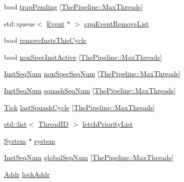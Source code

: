\begin{DoxyCompactItemize}
\item 
bool \hyperlink{classInOrderCPU_ab7c4ed509aab4ab66a4d1c212dab659c}{trapPending} \mbox{[}\hyperlink{namespaceThePipeline_ac9c0bbe9cf27d93e08ea8ccc4096e633}{ThePipeline::MaxThreads}\mbox{]}
\item 
std::queue$<$ \hyperlink{classEvent}{Event} $\ast$ $>$ \hyperlink{classInOrderCPU_a27f6e838bf5d421831ac5e451e61ccce}{cpuEventRemoveList}
\item 
bool \hyperlink{classInOrderCPU_a2825a91132fe292d64dca3c61fd07410}{removeInstsThisCycle}
\item 
bool \hyperlink{classInOrderCPU_aae470a34ceb26576a60c1e6ed0d6e2e4}{nonSpecInstActive} \mbox{[}\hyperlink{namespaceThePipeline_ac9c0bbe9cf27d93e08ea8ccc4096e633}{ThePipeline::MaxThreads}\mbox{]}
\item 
\hyperlink{inst__seq_8hh_a258d93d98edaedee089435c19ea2ea2e}{InstSeqNum} \hyperlink{classInOrderCPU_a4ae669709931556f7ab17a0380eed72c}{nonSpecSeqNum} \mbox{[}\hyperlink{namespaceThePipeline_ac9c0bbe9cf27d93e08ea8ccc4096e633}{ThePipeline::MaxThreads}\mbox{]}
\item 
\hyperlink{inst__seq_8hh_a258d93d98edaedee089435c19ea2ea2e}{InstSeqNum} \hyperlink{classInOrderCPU_a8c48389ee147811c1be413cdd4be4b68}{squashSeqNum} \mbox{[}\hyperlink{namespaceThePipeline_ac9c0bbe9cf27d93e08ea8ccc4096e633}{ThePipeline::MaxThreads}\mbox{]}
\item 
\hyperlink{base_2types_8hh_a5c8ed81b7d238c9083e1037ba6d61643}{Tick} \hyperlink{classInOrderCPU_a07ac7fa00a59be2904eaa76d4735681e}{lastSquashCycle} \mbox{[}\hyperlink{namespaceThePipeline_ac9c0bbe9cf27d93e08ea8ccc4096e633}{ThePipeline::MaxThreads}\mbox{]}
\item 
\hyperlink{classstd_1_1list}{std::list}$<$ \hyperlink{base_2types_8hh_ab39b1a4f9dad884694c7a74ed69e6a6b}{ThreadID} $>$ \hyperlink{classInOrderCPU_a22a54b30ea66b2e4740a1a3d55de098f}{fetchPriorityList}
\item 
\hyperlink{classSystem}{System} $\ast$ \hyperlink{classInOrderCPU_af27ccd765f13a4b7bd119dc7579e2746}{system}
\item 
\hyperlink{inst__seq_8hh_a258d93d98edaedee089435c19ea2ea2e}{InstSeqNum} \hyperlink{classInOrderCPU_a7df535223a2576eed74b77ef2e59a657}{globalSeqNum} \mbox{[}\hyperlink{namespaceThePipeline_ac9c0bbe9cf27d93e08ea8ccc4096e633}{ThePipeline::MaxThreads}\mbox{]}
\item 
\hyperlink{base_2types_8hh_af1bb03d6a4ee096394a6749f0a169232}{Addr} \hyperlink{classInOrderCPU_a6ef203de76af61b4babb98f152867401}{lockAddr}
\item 

\end{DoxyCompactItemize}
